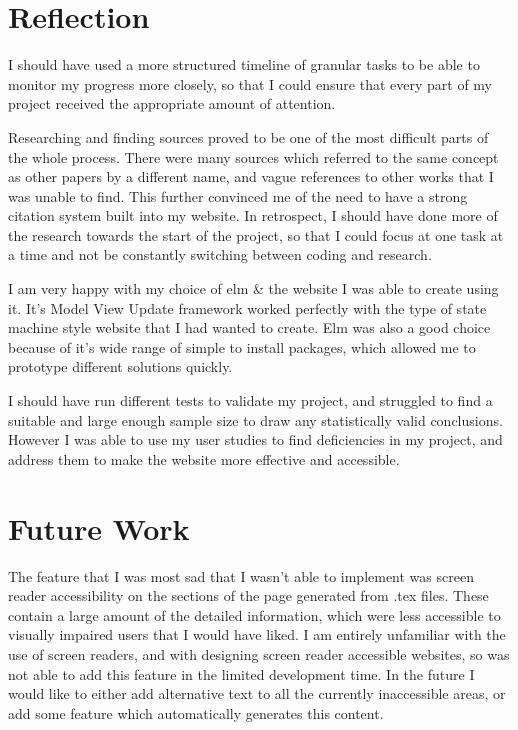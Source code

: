 \documentclass{l4proj}
\begin{document}
\section{Reflection}

I should have used a more structured timeline of granular tasks to be able to monitor my progress more closely, so that I could ensure that every part of my project received the appropriate amount of attention. 

Researching and finding sources proved to be one of the most difficult parts of the whole process.  There were many sources which referred to the same concept as other papers by a different name, and vague references to other works that I was unable to find.  This further convinced me of the need to have a strong citation system built into my website.  In retrospect, I should have done more of the research towards the start of the project, so that I could focus at one task at a time and not be constantly switching between coding and research.

I am very happy with my choice of elm \& the website I was able to create using it.  It's Model  View Update framework worked perfectly with the type of state machine style website that I had wanted to create.  Elm was also a good choice because of it's wide range of simple to install packages, which allowed me to prototype different solutions quickly.

I should have run different tests to validate my project, and struggled to find a suitable and large enough sample size to draw any statistically valid conclusions.  However I was able to use my user studies to find deficiencies in my project, and address them to make the website more effective and accessible.

\section{Future Work}

The feature that I was most sad that I wasn't able to implement was screen reader accessibility on the sections of the page generated from .tex files.  These contain a large amount of the detailed information, which were less accessible to visually impaired users that I would have liked.  I am entirely unfamiliar with the use of screen readers, and with designing screen reader accessible websites, so was not able to add this feature in the limited development time.  In the future I would like to either add alternative text to all the currently inaccessible areas, or add some feature which automatically generates this content.
\end{document}
